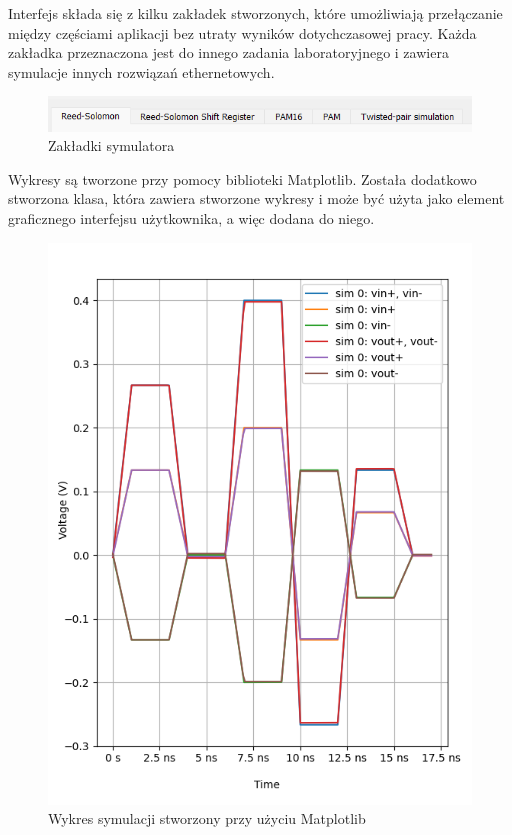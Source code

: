 Interfejs składa się z kilku zakładek stworzonych, które umożliwiają przełączanie między częściami aplikacji bez utraty wyników dotychczasowej pracy. Każda zakładka przeznaczona jest do innego zadania laboratoryjnego i zawiera symulacje innych rozwiązań ethernetowych.

\begin{figure}[ht]
    \centering
    \includegraphics{images/zakladki.png}
    \caption{Zakładki symulatora}
    \label{fig:zakladki_image}
\end{figure}

Wykresy są tworzone przy pomocy biblioteki Matplotlib. Została dodatkowo stworzona klasa, która zawiera stworzone wykresy i może być użyta jako element graficznego interfejsu użytkownika, a więc dodana do niego.

\begin{figure}[ht]
    \centering
    \includegraphics[scale=0.5]{images/wykres.png}
    \caption{Wykres symulacji stworzony przy użyciu Matplotlib}
    \label{fig:wykres_image}
\end{figure}

